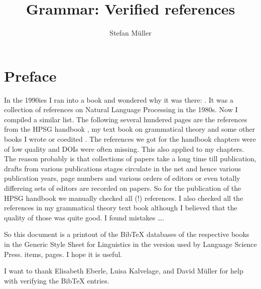 \documentclass{scrbook}
\title{Grammar: Verified references}
\author{Stefan Müller}
\begin{document}
\maketitle

\chapter*{Preface}

In the 1990ies I ran into a book and wondered why it was there: . It was a
collection of references on Natural Language Processing in the 1980s. Now I compiled a similar
list. The following several hundered pages are the references from the HPSG handbook
\citep{HPSGHandbook}, my text book on grammatical theory \citep{MuellerGT-Eng} and some other books
I wrote or coedited \citep*{MuellerGermanic,MOeDanish,FSM2022a-ed}. The
references we got for the handbook chapters were of low quality and DOIs were often missing. This
also applied to my chapters. The reason probably is that collections of papers take a long time till
publication, drafts from various publications stages circulate in the net and hence various
publication years, page numbers and various orders of editors or even totally differeing sets of
editors are recorded on papers. So for the publication of the HPSG handbook we manually checked all
(!) references. I also checked all the references in my grammatical theory text book although I
believed that the quality of those was quite good. I found mistakes \ldots.

So this document is a printout of the BibTeX databases of the respective books in the Generic Style
Sheet for Linguistics in the version used by Language Science Press. 
 items, \pageref{lastpage} pages.
I hope it is useful.

I want to thank Elisabeth Eberle, Luisa Kalvelage, and David Müller for help with verifying the
BibTeX entries.

\mainmatter


\nocite{*}

\printbibliography

\label{lastpage}
\end{document}
